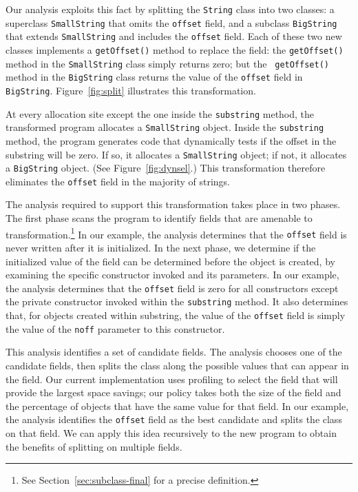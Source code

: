 \documentclass{sig-alt-full}
\begin{document}
Our analysis exploits this fact by splitting the 
{\tt String} class into two classes: a superclass {\tt SmallString}
that omits the {\tt offset} field, and a subclass {\tt BigString} that
extends {\tt SmallString} and includes the {\tt offset} field. 
Each of these two new classes implements a {\tt getOffset()} method
to replace the field: the {\tt getOffset()} method
in the {\tt SmallString} class simply returns zero; but the {\tt
getOffset()} method in the {\tt BigString} class returns the 
value of the {\tt offset} field in {\tt BigString}.
Figure~\ref{fig:split} illustrates this transformation.

At every allocation site except the one inside the {\tt substring}
method, the transformed program allocates a {\tt SmallString} 
object. Inside the {\tt substring} method, the program generates
code that dynamically tests if the offset in the substring
will be zero. If so, it allocates a {\tt SmallString} object;
if not, it allocates a {\tt BigString} object.
(See Figure~\ref{fig:dynsel}.)
This transformation
therefore eliminates the {\tt offset} field in the majority
of strings. 

The analysis required to support this transformation takes place
in two phases. The first phase scans the program
to identify fields that
are amenable to transformation.\footnote{See
  Section~\ref{sec:subclass-final} for a precise definition.}
In our example, the analysis
determines that the {\tt offset} field is never written after
it is initialized.
%
In the next phase, we determine if the initialized value of the field
can be determined before the object is created, by examining the
specific constructor invoked and its parameters.
%
 In our example, the analysis determines
that the {\tt offset} field is zero for all constructors
except the private constructor invoked within the {\tt substring}
method. It also determines that, for objects created within substring,
the value of the {\tt offset} field is simply
the value of the {\tt noff} parameter to this constructor. 

This analysis identifies a set of candidate fields. 
The analysis chooses one of the candidate fields, then 
splits the class along the possible values
that can appear in the field. Our current implementation uses
profiling to select the field that will provide the largest
space savings; our policy takes both the size of the field
and the percentage of objects that have the same value for 
that field. In our example, the analysis identifies the 
{\tt offset} field as the best candidate and splits the class
on that field. We can apply this idea recursively to the 
new program to obtain the benefits of splitting on multiple
fields. 
\end{document}
